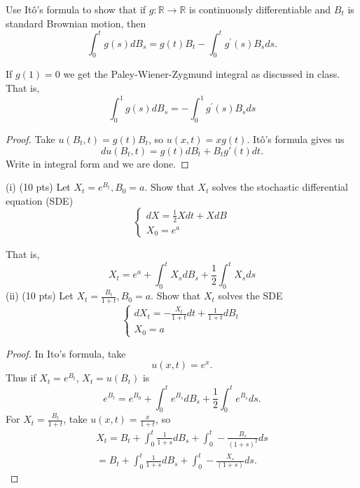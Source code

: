 
\begin{problem}
	Use Itô's formula to show that if $g: \mathbb{R} \rightarrow \mathbb{R}$ is continuously differentiable and $B_t$ is standard Brownian motion, then
\[
\int_0^t g(s) d B_s=g(t) B_t-\int_0^t g^{\prime}(s) B_s d s .
\]

If $g(1)=0$ we get the Paley-Wiener-Zygmund integral as discussed in class. That is,
\[
\int_0^1 g(s) d B_s=-\int_0^1 g^{\prime}(s) B_s d s
\]
\end{problem}
\begin{proof}
	Take $u(B_t, t) = g(t) B_t$, so $u(x, t) = xg(t)$. Itô's formula gives us
	\[
		d u(B_t, t) = g(t) d B_t + B_t g'(t) d t
	.\]
	Write in integral form and we are done.
\end{proof}

\begin{problem}
	(i) (10 pts) Let $X_t=e^{B_t}, B_0=a$. Show that $X_t$ solves the stochastic differential equation (SDE)
\[
\left\{\begin{array}{l}
d X=\frac{1}{2} X d t+X d B \\
X_0=e^a
\end{array}\right.
\]

That is,
\[
X_t=e^a+\int_0^t X_s d B_s+\frac{1}{2} \int_0^t X_s d s
\]
(ii) (10 pts) Let $X_t=\frac{B_t}{1+t}, B_0=a$. Show that $X_t$ solves the SDE
\[
\left\{\begin{array}{l}
d X_t=-\frac{X_t}{1+t} d t+\frac{1}{1+t} d B_t \\
X_0=a
\end{array}\right.
\]
\end{problem}
\begin{proof}
	In Ito's formula, take
	\[
		u(x, t) = e^x
	.\] 
	Thus if $X_t = e^{B_t}$, $X_t = u(B_t)$ is
	\[
		e^{B_t} = e^{B_0} + \int _0^t e^{B_s} d B_s + \frac{1}{2} \int _0^t e^{B_s} ds
	.\] 
	For $X_t = \frac{B_t}{ 1 + t}$, take $u(x,t ) = \frac{x}{1 + t}$, so
	\begin{multline}
		X_t 
		= B_t + \int _0^t \frac{1}{1 + s} d B_s + \int _0^t -\frac{B_s}{(1 + s)^2} ds
	\\ = B_t + \int _0^t \frac{1}{1 + s} d B_s + \int _0^t -\frac{X_s}{(1 + s)} ds
	.\end{multline} 
	
\end{proof}

